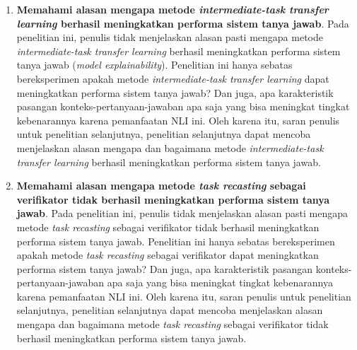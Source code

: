 \begin{enumerate}
    \item \textbf{Memahami alasan mengapa metode \emph{intermediate-task transfer learning} berhasil meningkatkan performa sistem tanya jawab}. Pada penelitian ini, penulis tidak menjelaskan alasan pasti mengapa metode \emph{intermediate-task transfer learning} berhasil meningkatkan performa sistem tanya jawab (\emph{model explainability}). Penelitian ini hanya sebatas bereksperimen apakah metode \emph{intermediate-task transfer learning} dapat meningkatkan performa sistem tanya jawab? Dan juga, apa karakteristik pasangan konteks-pertanyaan-jawaban apa saja yang bisa meningkat tingkat kebenarannya karena pemanfaatan NLI ini. Oleh karena itu, saran penulis untuk penelitian selanjutnya, penelitian selanjutnya dapat mencoba menjelaskan alasan mengapa dan bagaimana metode \emph{intermediate-task transfer learning} berhasil meningkatkan performa sistem tanya jawab.

    \item \textbf{Memahami alasan mengapa metode \emph{task recasting} sebagai verifikator tidak berhasil meningkatkan performa sistem tanya jawab}. Pada penelitian ini, penulis tidak menjelaskan alasan pasti mengapa metode \emph{task recasting} sebagai verifikator tidak berhasil meningkatkan performa sistem tanya jawab. Penelitian ini hanya sebatas bereksperimen apakah metode \emph{task recasting} sebagai verifikator dapat meningkatkan performa sistem tanya jawab? Dan juga, apa karakteristik pasangan konteks-pertanyaan-jawaban apa saja yang bisa meningkat tingkat kebenarannya karena pemanfaatan NLI ini. Oleh karena itu, saran penulis untuk penelitian selanjutnya, penelitian selanjutnya dapat mencoba menjelaskan alasan mengapa dan bagaimana metode \emph{task recasting} sebagai verifikator tidak berhasil meningkatkan performa sistem tanya jawab.
    
\end{enumerate}